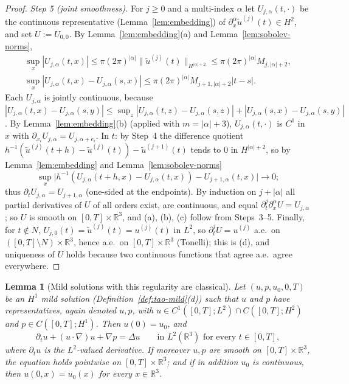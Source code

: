 \documentclass[11pt]{article}
\newtheorem{lemma}[theorem]{Lemma}
\theoremstyle{definition}
\theoremstyle{plain}
\newcommand{\R}{\mathbb R}
\newcommand{\norm}[1]{\lVert #1\rVert}
\begin{document}
\begin{proof}
\emph{Step 5 (joint smoothness).}  For $j\geq0$ and a multi-index $\alpha$
let $U_{j,\alpha}(t,\cdot)$ be the continuous representative
(Lemma~\ref{lem:embedding}) of $\partial_x^\alpha\tilde u^{(j)}(t)\in
H^{2}$, and set $U:=U_{0,0}$.  By Lemma~\ref{lem:embedding}(a) and
Lemma~\ref{lem:sobolev-norms},
\begin{gather*}
 \sup_x|U_{j,\alpha}(t,x)|\leq\pi(2\pi)^{|\alpha|}
 \norm{\tilde u^{(j)}(t)}_{H^{|\alpha|+2}}\leq\pi(2\pi)^{|\alpha|}
 M_{j,|\alpha|+2},\\
 \sup_x|U_{j,\alpha}(t,x)-U_{j,\alpha}(s,x)|\leq\pi(2\pi)^{|\alpha|}
 M_{j+1,|\alpha|+2}|t-s|.
\end{gather*}
Each $U_{j,\alpha}$ is jointly continuous, because $|U_{j,\alpha}(t,x)-
U_{j,\alpha}(s,y)|\leq\sup_z|U_{j,\alpha}(t,z)-U_{j,\alpha}(s,z)|
+|U_{j,\alpha}(s,x)-U_{j,\alpha}(s,y)|$.  By Lemma~\ref{lem:embedding}(b)
(applied with $m=|\alpha|+3$), $U_{j,\alpha}(t,\cdot)$ is $C^1$ in $x$
with $\partial_{x_i}U_{j,\alpha}=U_{j,\alpha+e_i}$.  In $t$: by Step~4 the
difference quotient $h^{-1}(\tilde u^{(j)}(t+h)-\tilde u^{(j)}(t))-\tilde
u^{(j+1)}(t)$ tends to $0$ in $H^{|\alpha|+2}$, so by
Lemma~\ref{lem:embedding} and Lemma~\ref{lem:sobolev-norms}
\[
 \sup_x\bigl|h^{-1}(U_{j,\alpha}(t+h,x)-U_{j,\alpha}(t,x))
 -U_{j+1,\alpha}(t,x)\bigr|\to0 ;
\]
thus $\partial_tU_{j,\alpha}=U_{j+1,\alpha}$ (one-sided at the
endpoints).  By induction on $j+|\alpha|$ all partial derivatives of $U$
of all orders exist, are continuous, and equal
$\partial_t^j\partial_x^\alpha U=U_{j,\alpha}$; so $U$ is smooth on
$[0,T]\times\R^3$, and (a), (b), (c) follow from Steps~3--5.  Finally, for
$t\notin N$, $U_{j,0}(t)=\tilde u^{(j)}(t)=u^{(j)}(t)$ in $L^2$, so
$\partial_t^jU=u^{(j)}$ a.e.\ on $([0,T]\setminus N)\times\R^3$, hence a.e.\
on $[0,T]\times\R^3$ (Tonelli); this is (d), and uniqueness of $U$ holds
because two continuous functions that agree a.e.\ agree everywhere.
\end{proof}

\begin{lemma}[Mild solutions with this regularity are classical]
\label{lem:mild-classical}
Let $(u,p,u_0,0,T)$ be an $H^1$ mild solution (Definition~\ref{def:tao-mild}(d))
such that $u$ and $p$ have representatives, again denoted $u,p$, with
$u\in C^1([0,T];L^2)\cap C([0,T];H^2)$ and $p\in C([0,T];H^1)$.  Then
$u(0)=u_0$, and
\[
 \partial_tu+(u\cdot\nabla)u+\nabla p=\Delta u\qquad\text{in }L^2(\R^3)
 \text{ for every }t\in[0,T],
\]
where $\partial_tu$ is the $L^2$-valued derivative.  If moreover $u,p$ are
smooth on $[0,T]\times\R^3$, the equation holds
pointwise on $[0,T]\times\R^3$; and if in addition $u_0$ is continuous, then
$u(0,x)=u_0(x)$ for every $x\in\R^3$.
\end{lemma}
\end{document}
